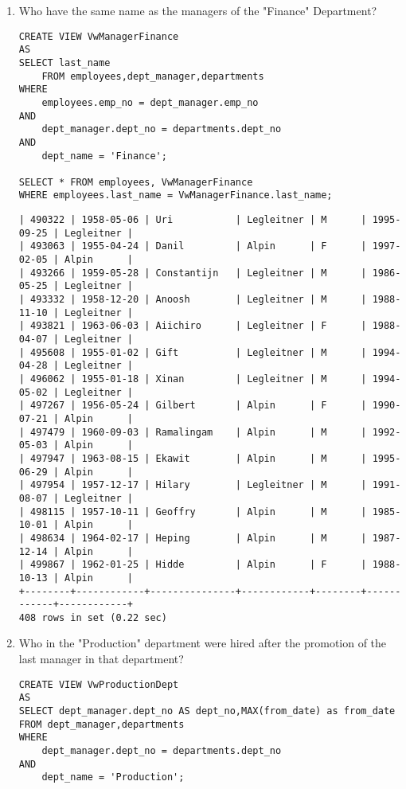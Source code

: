 \documentclass[]{article}
\begin{document}
\begin{enumerate}

\item Who have the same name as the managers of the "Finance" Department?

\begin{verbatim}
CREATE VIEW VwManagerFinance
AS
SELECT last_name
	FROM employees,dept_manager,departments
WHERE 
	employees.emp_no = dept_manager.emp_no
AND
	dept_manager.dept_no = departments.dept_no
AND
	dept_name = 'Finance';

SELECT * FROM employees, VwManagerFinance
WHERE employees.last_name = VwManagerFinance.last_name;
\end{verbatim}

\begin{verbatim}
| 490322 | 1958-05-06 | Uri           | Legleitner | M      | 1995-09-25 | Legleitner |
| 493063 | 1955-04-24 | Danil         | Alpin      | F      | 1997-02-05 | Alpin      |
| 493266 | 1959-05-28 | Constantijn   | Legleitner | M      | 1986-05-25 | Legleitner |
| 493332 | 1958-12-20 | Anoosh        | Legleitner | M      | 1988-11-10 | Legleitner |
| 493821 | 1963-06-03 | Aiichiro      | Legleitner | F      | 1988-04-07 | Legleitner |
| 495608 | 1955-01-02 | Gift          | Legleitner | M      | 1994-04-28 | Legleitner |
| 496062 | 1955-01-18 | Xinan         | Legleitner | M      | 1994-05-02 | Legleitner |
| 497267 | 1956-05-24 | Gilbert       | Alpin      | F      | 1990-07-21 | Alpin      |
| 497479 | 1960-09-03 | Ramalingam    | Alpin      | M      | 1992-05-03 | Alpin      |
| 497947 | 1963-08-15 | Ekawit        | Alpin      | M      | 1995-06-29 | Alpin      |
| 497954 | 1957-12-17 | Hilary        | Legleitner | M      | 1991-08-07 | Legleitner |
| 498115 | 1957-10-11 | Geoffry       | Alpin      | M      | 1985-10-01 | Alpin      |
| 498634 | 1964-02-17 | Heping        | Alpin      | M      | 1987-12-14 | Alpin      |
| 499867 | 1962-01-25 | Hidde         | Alpin      | F      | 1988-10-13 | Alpin      |
+--------+------------+---------------+------------+--------+------------+------------+
408 rows in set (0.22 sec)
\end{verbatim}

\item Who in the "Production" department were hired after the promotion of the last manager in that department?

\begin{verbatim}
CREATE VIEW VwProductionDept
AS
SELECT dept_manager.dept_no AS dept_no,MAX(from_date) as from_date 
FROM dept_manager,departments
WHERE
	dept_manager.dept_no = departments.dept_no
AND
	dept_name = 'Production';
	

\end{verbatim}
\end{enumerate}
\end{document}
